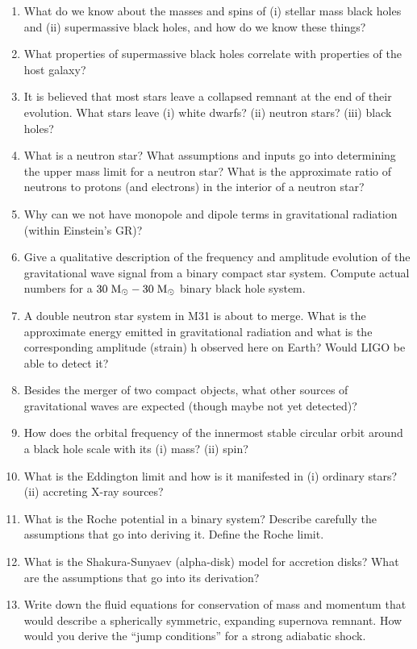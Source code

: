 \documentclass[11pt, oneside]{book}
\begin{document}
\begin{enumerate}[start=38, itemsep=0.4cm]
    \item What do we know about the masses and spins of (i) stellar mass black holes and (ii) supermassive black holes, and how do we know these things?
    \item What properties of supermassive black holes correlate with properties of the host galaxy?
    \item It is believed that most stars leave a collapsed remnant at the end of their evolution. What stars leave (i) white dwarfs? (ii) neutron stars? (iii) black holes?
    \item What is a neutron star? What assumptions and inputs go into determining the upper mass limit for a neutron star? What is the approximate ratio of neutrons to protons (and electrons) in the interior of a neutron star?
    \item Why can we not have monopole and dipole terms in gravitational radiation (within Einstein's GR)?
    \item Give a qualitative description of the frequency and amplitude evolution of the gravitational wave signal from a binary compact star system. Compute actual numbers for a $30 \; {\rm M_{\odot}} - 30 \; {\rm M_{\odot}}$ binary black hole system.
    \item A double neutron star system in M31 is about to merge. What is the approximate energy emitted in gravitational radiation and what is the corresponding amplitude (strain) h observed here on Earth? Would LIGO be able to detect it?
    \item Besides the merger of two compact objects, what other sources of gravitational waves are expected (though maybe not yet detected)?
    \item How does the orbital frequency of the innermost stable circular orbit around a black hole scale with its (i) mass? (ii) spin?
    \item What is the Eddington limit and how is it manifested in (i) ordinary stars? (ii) accreting X-ray sources?
    \item What is the Roche potential in a binary system? Describe carefully the assumptions that go into deriving it. Define the Roche limit.
    \item What is the Shakura-Sunyaev (alpha-disk) model for accretion disks? What are the assumptions that go into its derivation?
    \item Write down the fluid equations for conservation of mass and momentum that would describe a spherically symmetric, expanding supernova remnant. How would you derive the ``jump conditions'' for a strong adiabatic shock.

\end{enumerate}
\end{document}
